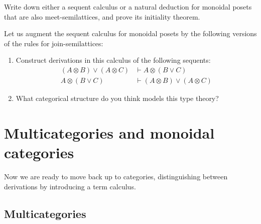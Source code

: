 \documentclass{book}
\let\types\vdash
\def\type{\;\ftype}
\let\join\vee
\let\tensor\otimes
\begin{document}
\begin{ex}\label{ex:monpos-mslat}
  Write down either a sequent calculus or a natural deduction for monoidal posets that are also meet-semilattices, and prove its initiality theorem.
\end{ex}

\begin{ex}\label{ex:monpos-jslat}
  Let us augment the sequent calculus for monoidal posets by the following versions of the rules for join-semilattices:
  \begin{enumerate}
  \item Construct derivations in this calculus of the following sequents:
    \begin{align*}
      (A\tensor B)\join (A\tensor C) &\types  A\tensor (B\join C)\\
      A\tensor (B\join C) &\types (A\tensor B)\join (A\tensor C)
    \end{align*}
  \item What categorical structure do you think models this type theory?
  \end{enumerate}
\end{ex}


\section{Multicategories and monoidal categories}
\label{sec:multicat-moncat}

Now we are ready to move back up to categories, distinguishing between derivations by introducing a term calculus.

\subsection{Multicategories}
\label{sec:multicats}
\end{document}
